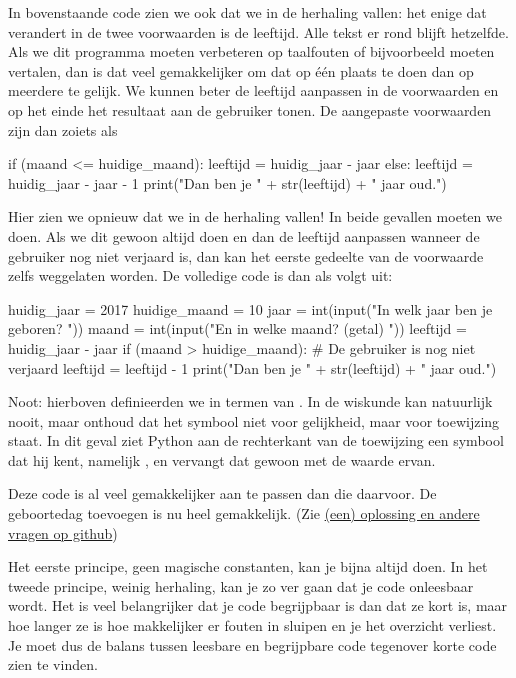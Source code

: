   In bovenstaande code zien we ook dat we in de herhaling vallen: het
  enige dat verandert in de twee voorwaarden is de leeftijd. Alle tekst er rond
  blijft hetzelfde. Als we dit programma moeten verbeteren op taalfouten of
  bijvoorbeeld moeten vertalen, dan is dat veel gemakkelijker om dat op \'e\'en
  plaats te doen dan op meerdere te gelijk. We kunnen beter de leeftijd
  aanpassen in de voorwaarden en op het einde het resultaat aan de gebruiker
  tonen. De aangepaste voorwaarden zijn dan zoiets als
  \begin{python}
    if (maand <= huidige_maand):
      leeftijd = huidig_jaar - jaar
    else:
      leeftijd = huidig_jaar - jaar - 1
    print("Dan ben je " + str(leeftijd) + " jaar oud.")
  \end{python}
  Hier zien we opnieuw dat we in de herhaling vallen! In beide gevallen moeten
  we  doen. Als we dit gewoon altijd doen en dan de
  leeftijd aanpassen wanneer de gebruiker nog niet verjaard is, dan kan het
  eerste gedeelte van de voorwaarde zelfs weggelaten worden. De volledige code
  is dan als volgt uit:
  \begin{python}
    huidig_jaar   = 2017
    huidige_maand = 10
    jaar  = int(input("In welk jaar ben je geboren? "))
    maand = int(input("En in welke maand? (getal) "))
    leeftijd = huidig_jaar - jaar
    if (maand > huidige_maand):
      # De gebruiker is nog niet verjaard
      leeftijd = leeftijd - 1
    print("Dan ben je " + str(leeftijd) + " jaar oud.")
  \end{python}
  Noot: hierboven definieerden we  in termen van . In
  de wiskunde kan  natuurlijk nooit, maar onthoud dat het
  symbool \py{=} niet voor gelijkheid, maar voor toewijzing staat. In dit geval ziet
  Python aan de rechterkant van de toewijzing een symbool dat hij kent, namelijk
  , en vervangt dat gewoon met de waarde ervan.

  Deze code is al veel gemakkelijker aan te passen dan die daarvoor. De
  geboortedag toevoegen is nu heel gemakkelijk. (Zie
  \href{https://github.com/TGThorax/python-ka2ring/blob/master/src/leeftijd.py}%
  {(een) oplossing en andere vragen op github})

  Het eerste principe, geen magische constanten, kan je bijna altijd doen. In
  het tweede principe, weinig herhaling, kan je zo ver gaan dat je code
  onleesbaar wordt. Het is veel belangrijker dat je code begrijpbaar is dan dat
  ze kort is, maar hoe langer ze is hoe makkelijker er fouten in sluipen en je
  het overzicht verliest. Je moet dus de balans tussen leesbare en begrijpbare
  code tegenover korte code zien te vinden.

